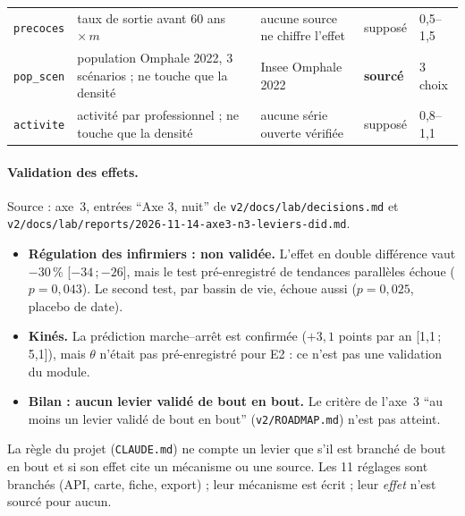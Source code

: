 \begin{small}
\begin{longtable}{@{}p{}p{}p{}p{}p{}@{}}
\texttt{precoces} & taux de sortie avant 60 ans $\times\,m$ & aucune source ne chiffre l'effet & supposé & 0,5--1,5\mesure{} \\
\texttt{pop\_\allowbreak{}scen} & population Omphale 2022, 3\mesure{} scénarios ; ne touche que la densité & Insee Omphale 2022 & \textbf{sourcé} & 3\mesure{} choix \\
\texttt{activite} & activité par professionnel ; ne touche que la densité & aucune série ouverte vérifiée & supposé & 0,8--1,1\mesure{} \\
\end{longtable}
\end{small}

\paragraph{Validation des effets.}
Source : axe~3, entrées \enquote{Axe 3, nuit} de \texttt{v2/\allowbreak{}docs/\allowbreak{}lab/\allowbreak{}decisions.md} et \texttt{v2/\allowbreak{}docs/\allowbreak{}lab/\allowbreak{}reports/\allowbreak{}2026-\allowbreak{}11-\allowbreak{}14-\allowbreak{}axe3-\allowbreak{}n3-\allowbreak{}leviers-\allowbreak{}did.md}.
\begin{itemize}
\item \textbf{Régulation des infirmiers : non validée.} L'effet en double différence vaut $-30$\mesure{}\,\% [$-34$\,;\,$-26$]\mesure{}, mais le test pré-enregistré de tendances parallèles échoue ($p=0{,}043$\mesure{}). Le second test, par bassin de vie, échoue aussi ($p=0{,}025$\mesure{}, placebo de date).
\item \textbf{Kinés.} La prédiction marche--arrêt est confirmée ($+3{,}1$\mesure{} points par an [1,1\,;\,5,1]\mesure{}), mais $\theta$ n'était pas pré-enregistré pour E2 : ce n'est pas une validation du module.
\item \textbf{Bilan : aucun levier validé de bout en bout.} Le critère de l'axe~3 \enquote{au moins un levier validé de bout en bout} (\texttt{v2/\allowbreak{}ROADMAP.md}) n'est pas atteint.
\end{itemize}
La règle du projet (\texttt{CLAUDE.md}) ne compte un levier que s'il est branché de bout en bout et si son effet cite un mécanisme ou une source.
Les 11\mesure{} réglages sont branchés (API, carte, fiche, export) ; leur mécanisme est écrit ; leur \emph{effet} n'est sourcé pour aucun\derive{}.

